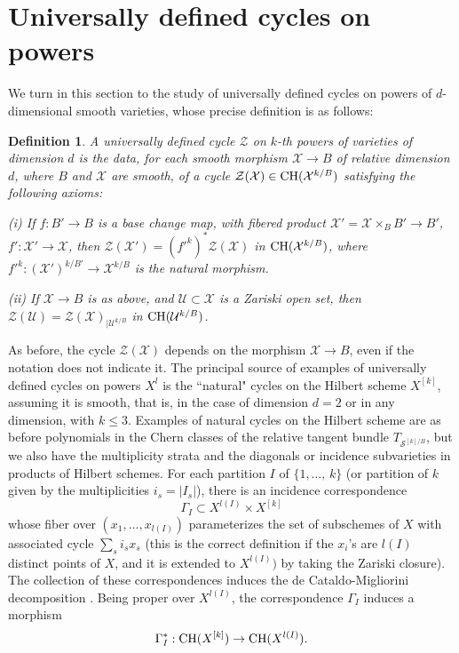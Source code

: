 \documentclass[10pt]{article}
\newtheorem{Defi}[theo]{Definition}
\begin{document}
\section{Universally defined cycles on powers\label{sectionavecpuissance}}
We turn in this section to the study of universally defined cycles on powers of $d$-dimensional smooth varieties, whose precise definition is as follows:
\begin{Defi}\label{defiunipower} A universally defined cycle
$\mathcal{Z}$  on $k$-th powers of varieties of dimension $d$ is
the data, for each smooth  morphism $\mathcal{X}\rightarrow B$ of relative dimension $d$, where $B$ and $\mathcal{X} $ are smooth,
of a cycle
$\mathcal{Z}(\mathcal{X})\in{\rm CH}(\mathcal{X}^{k/B})$ satisfying the following axioms:

(i) If $f: B'\rightarrow B$ is a base change map, with fibered product $\mathcal{X}'=\mathcal{X}\times_{B}B'\rightarrow B'$, ${f'}:\mathcal{X}'\rightarrow \mathcal{X}$,
then $ \mathcal{Z}(\mathcal{X}')=({f'}^k)^*\mathcal{Z}(\mathcal{X})$ in ${\rm CH}(\mathcal{X}^{k/B})$, where
${f'}^k:(\mathcal{X}')^{k/B'}\rightarrow \mathcal{X}^{k/B}$  is  the natural morphism.


(ii) If $\mathcal{X}\rightarrow B$ is as above, and $\mathcal{U}\subset \mathcal{X}$ is a Zariski open set, then
$\mathcal{Z}(\mathcal{U})=\mathcal{Z}(\mathcal{X})_{\mid \mathcal{U}^{k/B}}$ in ${\rm CH}( \mathcal{U}^{k/B})$.
\end{Defi}
As before, the cycle  $\mathcal{Z}(\mathcal{X})$ depends on the morphism $\mathcal{X}\rightarrow B$, even if  the notation does not indicate it.
The principal source of examples of universally defined cycles on powers $X^l$ is the
``natural" cycles  on the Hilbert scheme $X^{[k]}$, assuming it is smooth, that is, in the case of dimension $d=2$ or in any dimension, with $k\leq 3$. Examples of natural  cycles on the Hilbert scheme are as before polynomials in  the Chern classes of the
relative tangent bundle $T_{\mathcal{S}^{[k]/B}}$, but we   also have  the
multiplicity strata and the diagonals or incidence subvarieties in products of Hilbert schemes.
For each partition $I$ of $\{1,\ldots,\,k\}$ (or partition of $k$ given by the multiplicities $i_s=|I_s|$), there
is
an incidence correspondence
$$\Gamma_I\subset X^{l(I)}\times X^{[k]}$$
whose fiber over $(x_1,\ldots,x_{l(I)})$  parameterizes the set of subschemes
of $X$ with associated cycle $\sum_si_sx_s$  (this is the correct definition if the $x_i$'s are  $l(I)$ distinct points of $X$, and it is extended to $X^{l(I)}) $ by taking the Zariski closure). The collection of these correspondences induces the de Cataldo-Migliorini decomposition \cite{deca}.
Being proper over $X^{l(I)} $, the correspondence $\Gamma_I$ induces
a morphism
$$\Gamma_I^*:{\rm CH}(X^{[k]})\rightarrow {\rm CH}(X^{l(I)}).$$
\end{document}
